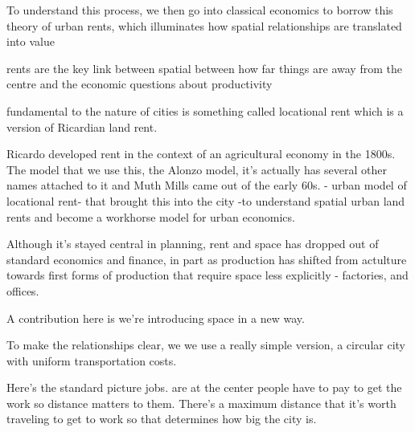 To understand this process, we then  go into classical economics to borrow this theory of urban rents, which illuminates how  spatial relationships are translated into value 

rents are the key link between spatial between how far things are away from the centre and the economic questions about productivity %

fundamental to the nature of cities is something called locational rent %
which is a version of Ricardian land rent.

Ricardo developed rent in the context of an agricultural economy in the 1800s. 
The model that we use this, the Alonzo model, it's actually has several other names attached to it and Muth Mills came out of the early 60s. - urban model of locational rent- that brought this into the city -to understand spatial urban land rents and become a workhorse model for urban economics.

Although it's stayed central in planning, rent and space has dropped out of standard economics and finance, in part as production has shifted from actulture towards first forms of production that require space less explicitly - factories, and offices.

A contribution here is we're introducing space in a new way.

To make the relationships clear, we  %
we use a really simple version, a circular city with uniform transportation costs.

Here's the standard picture jobs. are at the center people have to pay to get the work so distance matters to them. There's a maximum distance that it's worth traveling to get to work so that determines how big the city is.

